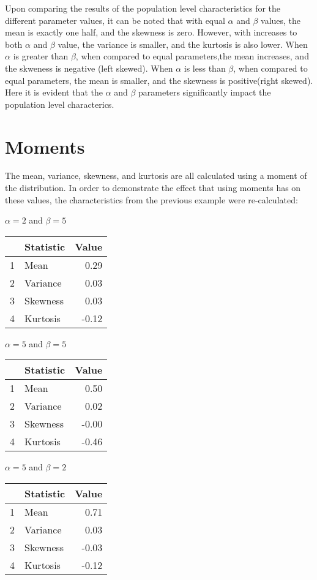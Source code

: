 \documentclass{article}\usepackage[]{graphicx}\usepackage[]{xcolor}
\begin{document}
\begin{multicols}{2}
Upon comparing the results of the population level characteristics for the different parameter values, it can be noted that with equal $\alpha$ and $\beta$ values, the mean is exactly one half, and the skewness is zero. However, with increases to both $\alpha$ and $\beta$ value, the variance is smaller, and the kurtosis is also lower. When $\alpha$ is greater than $\beta$, when compared to equal parameters,the mean increases, and the skweness is negative (left skewed). When $\alpha$ is less than $\beta$, when compared to equal parameters, the mean is smaller, and the skewness is positive(right skewed). Here it is evident that the $\alpha$ and $\beta$ parameters significantly impact the population level characterics.

\section{Moments}
The mean, variance, skewness, and kurtosis are all calculated using a moment of the distribution. In order to demonstrate the effect that using moments has on these values, the characteristics from the previous example were re-calculated:


$\alpha = 2$ and $\beta = 5$
\begin{table}[H]
\centering
\begin{tabular}{|c|l|r|}
  \hline
 & Statistic & Value \\ 
  \hline
  1 & Mean & 0.29 \\ 
  2 & Variance & 0.03 \\ 
  3 & Skewness & 0.03 \\ 
  4 & Kurtosis & -0.12 \\ 
   \hline
\end{tabular}
\end{table}

$\alpha = 5$ and $\beta = 5$
\begin{table}[H]
\centering
\begin{tabular}{|c|l|r|}
  \hline
 & Statistic & Value \\ 
  \hline
  1 & Mean & 0.50 \\ 
  2 & Variance & 0.02 \\ 
  3 & Skewness & -0.00 \\ 
  4 & Kurtosis & -0.46 \\ 
   \hline
\end{tabular}
\end{table}

$\alpha = 5$ and $\beta = 2$
\begin{table}[H]
\centering
\begin{tabular}{|c|l|r|}
  \hline
 & Statistic & Value \\ 
  \hline
  1 & Mean & 0.71 \\ 
  2 & Variance & 0.03 \\ 
  3 & Skewness & -0.03 \\ 
  4 & Kurtosis & -0.12 \\ 
   \hline
\end{tabular}
\end{table}


\end{multicols}
\end{document}
